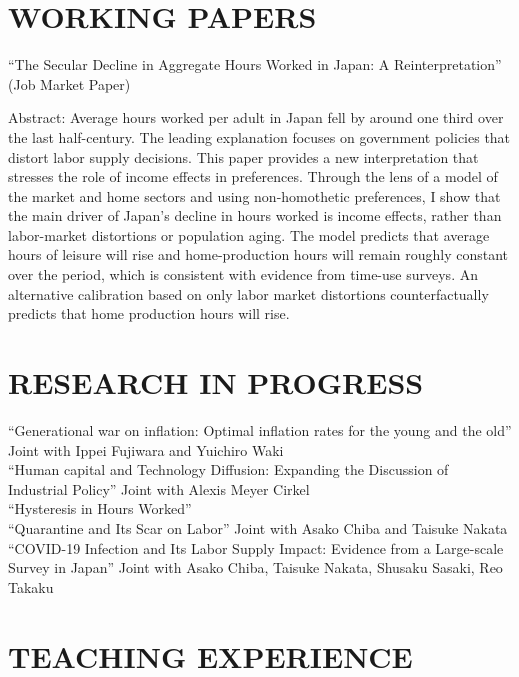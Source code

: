 \documentclass[12pt]{article}
\begin{document}
\section*{WORKING PAPERS}
``The Secular Decline in Aggregate Hours Worked in Japan: A Reinterpretation'' (Job Market Paper)
\begin{adjustwidth}{1em}{1em}
Abstract: Average hours worked per adult in Japan fell by around one third over the last half-century. The leading explanation focuses on government policies that distort labor supply decisions. This paper provides a new interpretation that stresses the role of income effects in preferences. Through the lens of a model of the market and home sectors and using non-homothetic preferences, I show that the main driver of Japan's decline in hours worked is income effects, rather than labor-market distortions or population aging. The model predicts that average hours of leisure will rise and home-production hours will remain roughly constant over the period, which is consistent with evidence from time-use surveys. An alternative calibration based on only labor market distortions counterfactually predicts that home production hours will rise.
\end{adjustwidth}

\section*{RESEARCH IN PROGRESS}
``Generational war on inflation: Optimal inflation rates for the young and the old'' Joint with Ippei Fujiwara and Yuichiro Waki\\
``Human capital and Technology Diffusion: Expanding the Discussion of Industrial Policy'' Joint with Alexis Meyer Cirkel\\
``Hysteresis in Hours Worked''\\
``Quarantine and Its Scar on Labor'' Joint with Asako Chiba and Taisuke Nakata\\
``COVID-19 Infection and Its Labor Supply Impact: Evidence from a Large-scale Survey in Japan'' Joint with Asako Chiba, Taisuke Nakata, Shusaku Sasaki, Reo Takaku


\section*{TEACHING EXPERIENCE}
\end{document}

